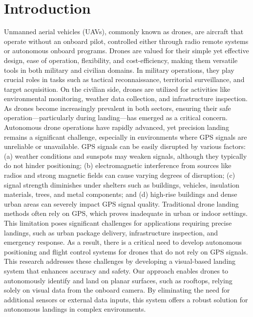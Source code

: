 \documentclass[3p,times]{elsarticle}
\begin{document}
\section{Introduction}
Unmanned aerial vehicles (UAVs), commonly known as drones, are aircraft that operate without an onboard pilot, controlled either through radio remote systems or autonomous onboard programs. Drones are valued for their simple yet effective design, ease of operation, flexibility, and cost-efficiency, making them versatile tools in both military and civilian domains. In military operations, they play crucial roles in tasks such as tactical reconnaissance, territorial surveillance, and target acquisition. On the civilian side, drones are utilized for activities like environmental monitoring, weather data collection, and infrastructure inspection. As drones become increasingly prevalent in both sectors, ensuring their safe operation—particularly during landing—has emerged as a critical concern.\\Autonomous drone operations have rapidly advanced, yet precision landing remains a significant challenge, especially in environments where GPS signals are unreliable or unavailable. GPS signals can be easily disrupted by various factors: (a) weather conditions and sunspots may weaken signals, although they typically do not hinder positioning; (b) electromagnetic interference from sources like radios and strong magnetic fields can cause varying degrees of disruption; (c) signal strength diminishes under shelters such as buildings, vehicles, insulation materials, trees, and metal components; and (d) high-rise buildings and dense urban areas can severely impact GPS signal quality. Traditional drone landing methods often rely on GPS, which proves inadequate in urban or indoor settings. This limitation poses significant challenges for applications requiring precise landings, such as urban package delivery, infrastructure inspection, and emergency response. As a result, there is a critical need to develop autonomous positioning and flight control systems for drones that do not rely on GPS signals.\\
This research addresses these challenges by developing a visual-based landing system that enhances accuracy and safety. Our approach enables drones to autonomously identify and land on planar surfaces, such as rooftops, relying solely on visual data from the onboard camera. By eliminating the need for additional sensors or external data inputs, this system offers a robust solution for autonomous landings in complex environments.
\end{document}
